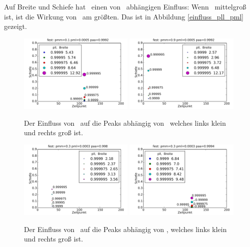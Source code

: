 Auf Breite und Schiefe hat \pll\ einen von \pml\ abhängigen Einfluss: Wenn \pml\ mittelgroß ist, ist die Wirkung von \pll\ am größten. Das ist in Abbildung \ref{einfluss_pll_pml} gezeigt.

\begin{figure}[]

\includegraphics[width=0.49\textwidth]{bilder/pll/3fest_01_00005_09992_p}
\includegraphics[width=0.49\textwidth]{bilder/pll/3fest_09_00005_09992_p}

\caption[Der Einfluss von \pll\ auf die Peaks abhängig von \pmm]{Der Einfluss von \pll\ auf die Peaks abhängig von \pmm\, welches links klein und rechts groß ist.}
\label{einfluss_pll_pmm}
\end{figure}


\begin{figure}[h]

\includegraphics[width=0.49\textwidth]{bilder/pll/3fest_03_00003_0998_p}
\includegraphics[width=0.49\textwidth]{bilder/pll/3fest_03_00003_09994_p}

\caption[Der Einfluss von \pll\ auf die Peaks abhängig von \paa]{Der Einfluss von \pll\ auf die Peaks abhängig von \paa, welches links klein und rechts groß ist.}
\label{einfluss_pll_paa}
\end{figure}

